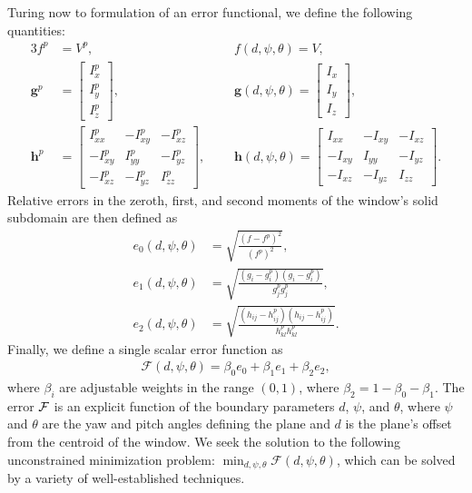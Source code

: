 Turing now to formulation of an error functional, we define the following quantities:
\begin{alignat}{3}
f^p &= V^p, \text{\ \ \ \ \ }&&f(d,\psi,\theta) = V, \\
\bm{g}^p &= \left[\begin{array} {ccc} {I_x^p} \\ {I_y^p} \\ {I_z^p} \end{array} \right], \text{\ \ \ \ \ }&&\bm{g}(d,\psi,\theta) = \left[\begin{array} {ccc} {I_x} \\ {I_y} \\ {I_z} \end{array} \right], \\
\bm{h}^p &= \left[\begin{array} {ccc} {I_{xx}^p} & {-I_{xy}^p} & {-I_{xz}^p}\\ {-I_{xy}^p} & {I_{yy}^p} & {-I_{yz}^p} \\ -{I_{xz}^p} & {-I_{yz}^p} & {I_{zz}^p} \end{array} \right],\text{\ \ \ \ \ \ \ }&&\bm{h}(d,\psi,\theta) = \left[\begin{array} {ccc} {I_{xx}} & {-I_{xy}} & {-I_{xz}}\\ {-I_{xy}} & {I_{yy}} & {-I_{yz}} \\ -{I_{xz}} & {-I_{yz}} & {I_{zz}} \end{array} \right].
\end{alignat}
Relative errors in the zeroth, first, and second moments of the window's solid subdomain are then defined as
\begin{align}
e_0(d,\psi,\theta) &=  \sqrt{\frac{(f - f^p)^2}{(f^p)^2}}, \\
e_1(d,\psi,\theta) &=  \sqrt{\frac{(g_i - g_i^p)(g_i - g_i^p)}{g_j^{p}g_j^{p}}}, \\
e_2(d,\psi,\theta) &=  \sqrt{\frac{(h_{ij} - h_{ij}^p)(h_{ij} - h_{ij}^p)}{h_{kl}^{p}h_{kl}^{p}}}.
\end{align}
Finally, we define a single scalar error function as
\begin{align}
\mathcal{F}(d,\psi,\theta) = \beta_0e_0 + \beta_1e_1 + \beta_2e_2,
\end{align}
where $\beta_i$ are adjustable weights in the range $(0,1)$, where $\beta_2 = 1 - \beta_0 - \beta_1$.  The error $\mathcal{F}$ is an explicit function of the boundary parameters $d$, $\psi$, and $\theta$, where $\psi$ and $\theta$ are the yaw and pitch angles defining the plane and $d$ is the plane's offset from the centroid of the window.  We seek the solution to the following unconstrained minimization problem: $\displaystyle \min_{d, \psi, \theta} \mathcal{F}(d,\psi,\theta)$, which can be solved by a variety of well-established techniques.

